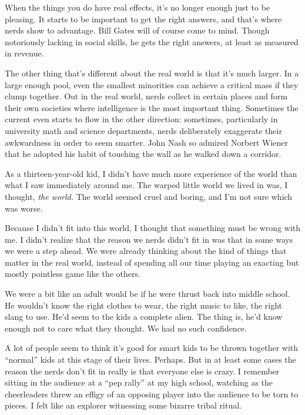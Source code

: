 When the things you do have real effects, it's no longer enough just to
be pleasing. It starts to be important to get the right answers, and
that's where nerds show to advantage. Bill Gates will of course come to
mind. Though notoriously lacking in social skills, he gets the right
answers, at least as measured in revenue.

The other thing that's different about the real world is that it's much
larger. In a large enough pool, even the smallest minorities can achieve
a critical mass if they clump together. Out in the real world, nerds
collect in certain places and form their own societies where
intelligence is the most important thing. Sometimes the current even
starts to flow in the other direction: sometimes, particularly in
university math and science departments, nerds deliberately exaggerate
their awkwardness in order to seem smarter. John Nash so admired Norbert
Wiener that he adopted his habit of touching the wall as he walked down
a corridor.

As a thirteen-year-old kid, I didn't have much more experience of the
world than what I saw immediately around me. The warped little world we
lived in was, I thought, \emph{the world.} The world seemed cruel and
boring, and I'm not sure which was worse.

Because I didn't fit into this world, I thought that something must be
wrong with me. I didn't realize that the reason we nerds didn't fit in
was that in some ways we were a step ahead. We were already thinking
about the kind of things that matter in the real world, instead of
spending all our time playing an exacting but mostly pointless game like
the others.

We were a bit like an adult would be if he were thrust back into middle
school. He wouldn't know the right clothes to wear, the right music to
like, the right slang to use. He'd seem to the kids a complete alien.
The thing is, he'd know enough not to care what they thought. We had no
such confidence.

A lot of people seem to think it's good for smart kids to be thrown
together with ``normal'' kids at this stage of their lives. Perhaps. But
in at least some cases the reason the nerds don't fit in really is that
everyone else is crazy. I remember sitting in the audience at a ``pep
rally'' at my high school, watching as the cheerleaders threw an effigy
of an opposing player into the audience to be torn to pieces. I felt
like an explorer witnessing some bizarre tribal ritual.


